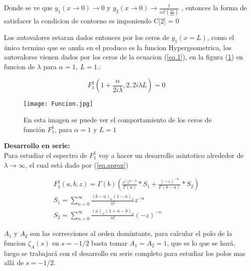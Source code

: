 Donde se ve que $y _1 (x \rightarrow 0 ) \rightarrow 0$ y $y _2 (x \rightarrow 0)  \rightarrow
\frac{1}{  \alpha   \Gamma ( \frac{i \alpha}{2 \lambda}  )   } $ , entonces la forma de satisfacer la condicion de contorno es imponiendo C[2] = 0

Los autovalores estaran dados entonces por los ceros de $y_1 (x= L)$, como el único termino que se anula en el produco es la funcion Hypergeometrica, los autovalores vienen dados por los ceros de la ecuacion (\ref{eq.1}), en la figura (\ref{fig:funcion}) en funcion de $\lambda$ para  $\alpha=1, \ L=1$.:


\begin{equation}
F _1 ^1 (1+\frac{ \alpha}{2 i \lambda},2,2 i \lambda L)  = 0
\label{eq.1}
\end{equation}

\begin{figure}
\centering
\texttt{[image: Funcion.jpg]}
\caption{En esta imagen se puede ver el comportamiento de los ceros de función $F _1 ^1$, para $\alpha=1$ y $L=1$}
\label{fig:funcion}
\end{figure}

\textbf{Desarrollo en serie:} \\

Para estudiar el espectro de $F _1 ^1$ voy a hacer un desarrollo asintotico alrededor de $\lambda \rightarrow \infty$, el cual está dado por (\ref{eq.aprox})


\begin{equation}
\begin{array}{c}
    F _1 ^1 (a,b,z) = \Gamma (b) 
    \left(
    \frac{e^z z ^{a-b} }{\Gamma(a)} * S_1 + \frac{(-z) ^{ -a}}{ \Gamma(b-a)} 
    * S_2
    \right) \\ 
    S _1 = \sum _{n=0} ^{\infty} \frac{(b-a) _n (1-a) _n}{n!} z ^{-n} \\ 
    S _2 = \sum _{n=0} ^{\infty} \frac{(a) _n (1+a-b) _n}{n!} (-z) ^{-n}
    
\end{array}
\label{eq.aprox}
\end{equation}

$A_1$ y $A _2$ son las correcciones al orden domintante, para calcular el polo de la funcion $\zeta _A (s)$ en $s=-1/2$ basta tomar $A _1 = A _2 = 1$, que es lo que se hará, luego se trabajará con el desarrollo en serie completo para estudiar los polos mas allá de $s=-1/2$. 


